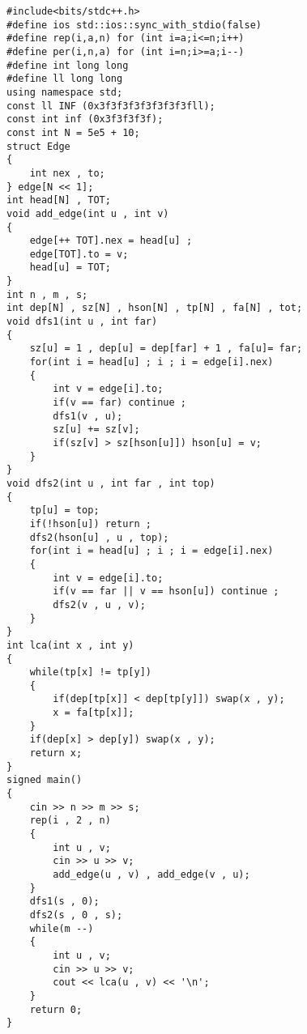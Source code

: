 \documentclass[E:/GsjzTle/main/main.tex]{subfiles}
\begin{document}
\begin{lstlisting}
#include<bits/stdc++.h>
#define ios std::ios::sync_with_stdio(false)
#define rep(i,a,n) for (int i=a;i<=n;i++)
#define per(i,n,a) for (int i=n;i>=a;i--)
#define int long long
#define ll long long
using namespace std;
const ll INF (0x3f3f3f3f3f3f3f3fll);
const int inf (0x3f3f3f3f);
const int N = 5e5 + 10;
struct Edge
{
	int nex , to;
} edge[N << 1];
int head[N] , TOT;
void add_edge(int u , int v)
{
	edge[++ TOT].nex = head[u] ;
	edge[TOT].to = v;
	head[u] = TOT;
}
int n , m , s;
int dep[N] , sz[N] , hson[N] , tp[N] , fa[N] , tot;
void dfs1(int u , int far)
{
	sz[u] = 1 , dep[u] = dep[far] + 1 , fa[u]= far;
	for(int i = head[u] ; i ; i = edge[i].nex)
	{
		int v = edge[i].to;
		if(v == far) continue ;
		dfs1(v , u);
		sz[u] += sz[v];
		if(sz[v] > sz[hson[u]]) hson[u] = v;
	}
}
void dfs2(int u , int far , int top)
{
	tp[u] = top;
	if(!hson[u]) return ;
	dfs2(hson[u] , u , top);
	for(int i = head[u] ; i ; i = edge[i].nex)
	{
		int v = edge[i].to;
		if(v == far || v == hson[u]) continue ;
		dfs2(v , u , v);
	}
}
int lca(int x , int y)
{
	while(tp[x] != tp[y])
	{
		if(dep[tp[x]] < dep[tp[y]]) swap(x , y);
		x = fa[tp[x]];
	}
	if(dep[x] > dep[y]) swap(x , y);
	return x;
}
signed main()
{
	cin >> n >> m >> s;
	rep(i , 2 , n)
	{
		int u , v;
		cin >> u >> v;
		add_edge(u , v) , add_edge(v , u);
	}
	dfs1(s , 0);
	dfs2(s , 0 , s);
	while(m --)
	{
		int u , v;
		cin >> u >> v;
		cout << lca(u , v) << '\n';
	}
	return 0;
}
\end{lstlisting}
\end{document}
